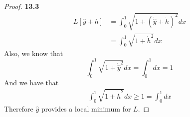 \documentclass[11pt]{article}
\theoremstyle{definition}
\begin{document}
\begin{proof}{\textbf{13.3}}
\begin{align*}
        L[\hat y + h]
        &= \int_0^1 \sqrt{1 + (\dot{\hat y} + \dot h)^2} dx\\
        &= \int_0^1 \sqrt{1 + \dot h^2} dx
    \end{align*}
    Also, we know that
    $$\int_0^1 \sqrt{1 + \dot{\hat y}^2} dx = \int_0^1 dx = 1$$
    And we have that
    \begin{align*}
        \int_0^1 \sqrt{1 + \dot h^2} dx \geq 1 = \int_0^1 dx
    \end{align*}
    Therefore $\hat y$ provides a local minimum for $L$.
\end{proof}
\cleardoublepage
\end{document}
